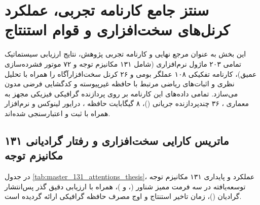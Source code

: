 \section{سنتز جامع کارنامه تجربی، عملکرد کرنل‌های سخت‌افزاری و قوام استنتاج}
\label{sec:benchmark_master_synthesis}

این بخش به عنوان مرجع نهایی و کارنامه تجربی پژوهش، نتایج ارزیابی سیستماتیک تمامی ۲۰۳ ماژول نرم‌افزاری (شامل ۱۳۱ مکانیزم توجه و ۷۲ موتور فشرده‌سازی عمیق)، کارنامه تفکیکی ۱۰۸ عملگر بومی  و ۲۶ کرنل سخت‌افزارآگاه  را همراه با تحلیل نظری و اثبات‌های ریاضی مرتبط با حافظه غیرپیوسته  و کدگشایی فرضی  مدون می‌سازد. تمامی داده‌های این کارنامه بر روی پردازنده گرافیکی فیزیکی  مجهز به معماری ، ۳۶ چندپردازنده جریانی ()، ۸ گیگابایت حافظه ، درایور لینوکس  و نرم‌افزار  همراه با  ثبت و اعتبارسنجی شده‌اند.

\subsection{ماتریس کارایی سخت‌افزاری و رفتار گرادیانی ۱۳۱ مکانیزم توجه}
\label{subsec:master_131_attentions}

در جدول \ref{tab:master_131_attentions_thesis}، عملکرد و پایداری ۱۳۱ مکانیزم توجه توسعه‌یافته در سه فرمت ممیز شناور (،  و )، همراه با ارزیابی دقیق گذر پس‌انتشار گرادیان ()، زمان تاخیر استنتاج و اوج مصرف حافظه گرافیکی ارائه گردیده است.

